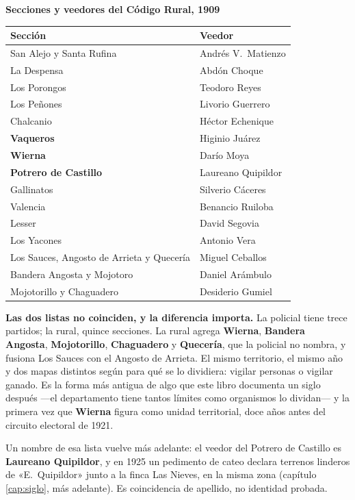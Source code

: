 {\sffamily\bfseries\footnotesize Secciones y veedores del Código Rural, 1909\par}
\vspace{0.5em}
{\small
\setlength{\LTpre}{0.6em}\setlength{\LTpost}{1.2em}
\begin{longtable}{@{}ll@{}}
\toprule
\textbf{Sección} & \textbf{Veedor} \\
\midrule
\endhead
San Alejo y Santa Rufina & Andrés V.\ Matienzo \\
La Despensa & Abdón Choque \\
Los Porongos & Teodoro Reyes \\
Los Peñones & Livorio Guerrero\index{Guerrero, Liborio} \\
Chalcanio & Héctor Echenique \\
\textbf{Vaqueros} & Higinio Juárez \\
\textbf{Wierna} & Darío Moya \\
\textbf{Potrero de Castillo} & Laureano Quipildor \\
Gallinatos & Silverio Cáceres \\
Valencia & Benancio Ruiloba \\
Lesser & David Segovia \\
Los Yacones & Antonio Vera \\
Los Sauces, Angosto de Arrieta y Quecería & Miguel Ceballos \\
Bandera Angosta y Mojotoro & Daniel Arámbulo \\
Mojotorillo y Chaguadero & Desiderio Gumiel \\
\bottomrule
\end{longtable}
}

\textbf{Las dos listas no coinciden, y la diferencia importa.} La policial tiene trece partidos;
la rural, quince secciones. La rural agrega \textbf{Wierna}, \textbf{Bandera Angosta},
\textbf{Mojotorillo}, \textbf{Chaguadero} y \textbf{Quecería}, que la policial no nombra, y
fusiona Los Sauces con el Angosto de Arrieta. El mismo territorio, el mismo año y dos mapas
distintos según para qué se lo dividiera: vigilar personas o vigilar ganado. Es la forma más
antigua de algo que este libro documenta un siglo después ---el departamento tiene tantos
límites como organismos lo dividan--- y la primera vez que \textbf{Wierna} figura como unidad
territorial, doce años antes del circuito electoral de 1921.

Un nombre de esa lista vuelve más adelante: el veedor del Potrero de Castillo es \textbf{Laureano
Quipildor}, y en 1925 un pedimento de cateo declara terrenos linderos de «E.\ Quipildor» junto a
la finca Las Nieves, en la misma zona (capítulo \ref{cap:siglo}, más adelante). Es coincidencia de apellido, no
identidad probada.

